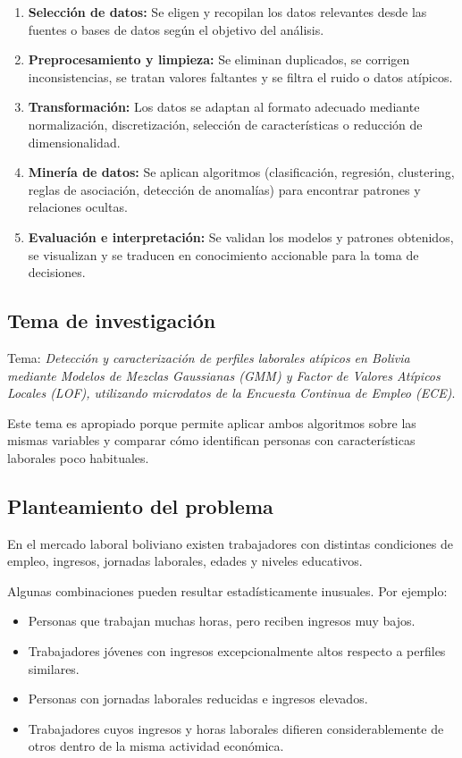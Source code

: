 \documentclass[12pt,a4paper]{article}
\begin{document}
\begin{enumerate}
  \item \textbf{Selección de datos:} Se eligen y recopilan los datos relevantes desde las fuentes o bases de datos según el objetivo del análisis.
  \item \textbf{Preprocesamiento y limpieza:} Se eliminan duplicados, se corrigen inconsistencias, se tratan valores faltantes y se filtra el ruido o datos atípicos.
  \item \textbf{Transformación:} Los datos se adaptan al formato adecuado mediante normalización, discretización, selección de características o reducción de dimensionalidad.
  \item \textbf{Minería de datos:} Se aplican algoritmos (clasificación, regresión, clustering, reglas de asociación, detección de anomalías) para encontrar patrones y relaciones ocultas.
  \item \textbf{Evaluación e interpretación:} Se validan los modelos y patrones obtenidos, se visualizan y se traducen en conocimiento accionable para la toma de decisiones.
\end{enumerate}

\subsection{Tema de investigación}

Tema: \emph{Detección y caracterización de perfiles laborales atípicos en Bolivia mediante Modelos de Mezclas Gaussianas (GMM) y Factor de Valores Atípicos Locales (LOF), utilizando microdatos de la Encuesta Continua de Empleo (ECE)}.

Este tema es apropiado porque permite aplicar ambos algoritmos sobre las mismas variables y comparar cómo identifican personas con características laborales poco habituales.

\subsection{Planteamiento del problema}

En el mercado laboral boliviano existen trabajadores con distintas condiciones de empleo, ingresos, jornadas laborales, edades y niveles educativos.

Algunas combinaciones pueden resultar estadísticamente inusuales. Por ejemplo:

\begin{itemize}
  \item Personas que trabajan muchas horas, pero reciben ingresos muy bajos.
  \item Trabajadores jóvenes con ingresos excepcionalmente altos respecto a perfiles similares.
  \item Personas con jornadas laborales reducidas e ingresos elevados.
  \item Trabajadores cuyos ingresos y horas laborales difieren considerablemente de otros dentro de la misma actividad económica.
\end{itemize}
\end{document}
